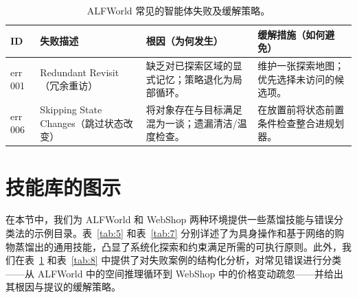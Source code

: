 \documentclass[11pt,UTF8,fontset=fandol]{ctexart}
\begin{document}
\begin{table}[H]\centering
\caption{ALFWorld 常见的智能体失败及缓解策略。}
\label{tab:6}
\small
\renewcommand{\arraystretch}{1.2}
\begin{tabular}{p{1.1cm}p{3.2cm}p{4.8cm}p{4.8cm}}
\toprule
ID & 失败描述 & 根因（为何发生） & 缓解措施（如何避免） \\
\midrule
err 001 & Redundant Revisit（冗余重访） & 缺乏对已探索区域的显式记忆；策略退化为局部循环。 & 维护一张探索地图；优先选择未访问的候选项。 \\
err 006 & Skipping State Changes（跳过状态改变） & 将对象存在与目标满足混为一谈；遗漏清洁/温度检查。 & 在放置前将状态前置条件检查整合进规划器。 \\
\bottomrule
\end{tabular}
\end{table}

\section{技能库的图示}

在本节中，我们为 ALFWorld 和 WebShop 两种环境提供一些蒸馏技能与错误分类法的示例目录。表~\ref{tab:5} 和表~\ref{tab:7} 分别详述了为具身操作和基于网络的购物蒸馏出的通用技能，凸显了系统化探索和约束满足所需的可执行原则。此外，我们在表~\ref{tab:6} 和表~\ref{tab:8} 中提供了对失败案例的结构化分析，对常见错误进行分类——从 ALFWorld 中的空间推理循环到 WebShop 中的价格变动疏忽——并给出其根因与提议的缓解策略。
\end{document}
